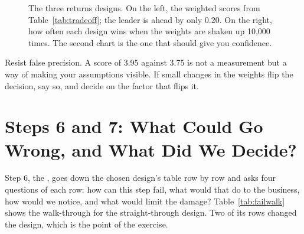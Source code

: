 \begin{figure}[htbp]
\centering
{}
\caption{The three returns designs. On the left, the weighted scores from Table~\ref{tab:tradeoff}; the leader is ahead by only 0.20. On the right, how often each design wins when the weights are shaken up 10{,}000 times. The second chart is the one that should give you confidence.}
\label{fig:scores}
\end{figure}

\begin{designnote}
Resist false precision. A score of 3.95 against 3.75 is not a measurement but a way of making your assumptions visible. If small changes in the weights flip the decision, say so, and decide on the factor that flips it.
\end{designnote}

\section{Steps 6 and 7: What Could Go Wrong, and What Did We Decide?}
\label{sec:failure-walk}

Step 6, the , goes down the chosen design's table row by row and asks four questions of each row: how can this step fail, what would that do to the business, how would we notice, and what would limit the damage? Table~\ref{tab:failwalk} shows the walk-through for the straight-through design. Two of its rows changed the design, which is the point of the exercise.

